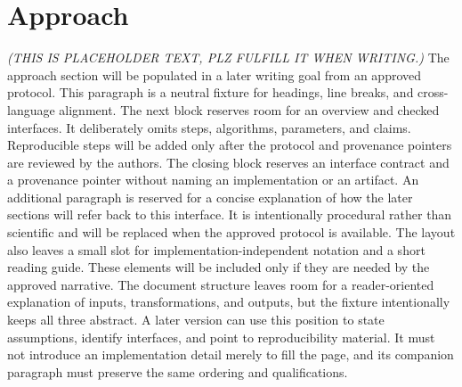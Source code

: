 \section{Approach}\label{sec:approach}
\textit{(THIS IS PLACEHOLDER TEXT, PLZ FULFILL IT WHEN WRITING.)}
The approach section will be populated in a later writing goal from an approved protocol. This paragraph is a neutral fixture for headings, line breaks, and cross-language alignment.
The next block reserves room for an overview and checked interfaces. It deliberately omits steps, algorithms, parameters, and claims.
Reproducible steps will be added only after the protocol and provenance pointers are reviewed by the authors.
The closing block reserves an interface contract and a provenance pointer without naming an implementation or an artifact.
An additional paragraph is reserved for a concise explanation of how the later sections will refer back to this interface. It is intentionally procedural rather than scientific and will be replaced when the approved protocol is available.
The layout also leaves a small slot for implementation-independent notation and a short reading guide. These elements will be included only if they are needed by the approved narrative.
The document structure leaves room for a reader-oriented explanation of inputs, transformations, and outputs, but the fixture intentionally keeps all three abstract. A later version can use this position to state assumptions, identify interfaces, and point to reproducibility material. It must not introduce an implementation detail merely to fill the page, and its companion paragraph must preserve the same ordering and qualifications.
